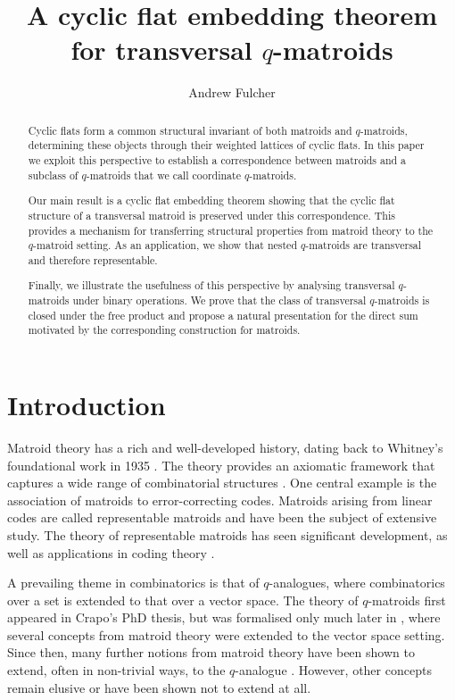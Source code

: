 \documentclass{article}
\title{A cyclic flat embedding theorem for transversal $q$-matroids}
\author{Andrew Fulcher}
\date{}
\theoremstyle{definition}
\begin{document}
\maketitle

\begin{abstract}
Cyclic flats form a common structural invariant of both matroids and $q$-matroids, determining these objects through their weighted lattices of cyclic flats. In this paper we exploit this perspective to establish a correspondence between matroids and a subclass of $q$-matroids that we call coordinate $q$-matroids. 

Our main result is a cyclic flat embedding theorem showing that the cyclic flat structure of a transversal matroid is preserved under this correspondence. This provides a mechanism for transferring structural properties from matroid theory to the $q$-matroid setting. As an application, we show that nested $q$-matroids are transversal and therefore representable.

Finally, we illustrate the usefulness of this perspective by analysing transversal $q$-matroids under binary operations. We prove that the class of transversal $q$-matroids is closed under the free product and propose a natural presentation for the direct sum motivated by the corresponding construction for matroids.
\end{abstract}

\section{Introduction}

Matroid theory has a rich and well-developed history, dating back to Whitney's foundational work in 1935 \cite{Whitney1935}. The theory provides an axiomatic framework that captures a wide range of combinatorial structures \cite{Welsh1976}. One central example is the association of matroids to error-correcting codes. Matroids arising from linear codes are called representable matroids and have been the subject of extensive study. The theory of representable matroids has seen significant development, as well as applications in coding theory \cite{BritzShiromoto2016,westerback_on_comb_LRCs}.

A prevailing theme in combinatorics is that of $q$-analogues, where combinatorics over a set is extended to that over a vector space. The theory of $q$-matroids first appeared in Crapo's PhD thesis, but was formalised only much later in \cite{JurriusPellikaan2018}, where several concepts from matroid theory were extended to the vector space setting. Since then, many further notions from matroid theory have been shown to extend, often in non-trivial ways, to the $q$-analogue \cite{ByrneCeriaJurrius2022}. However, other concepts remain elusive or have been shown not to extend at all.
\end{document}
